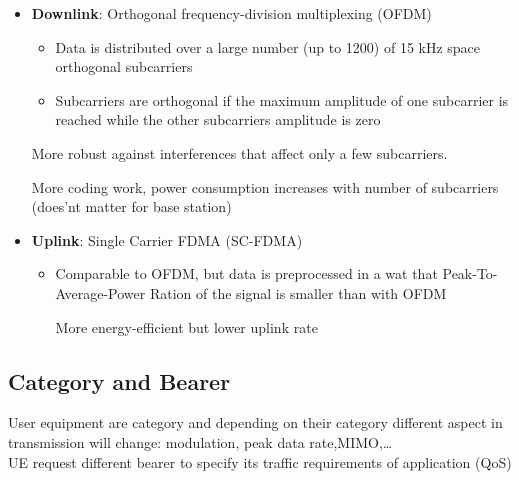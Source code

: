 \begin{itemize}
    \item \textbf{Downlink}: Orthogonal frequency-division multiplexing
        (OFDM)
        \begin{itemize}
            \item Data is distributed over a large number (up to 1200) of 15 kHz
                space orthogonal subcarriers

            \item Subcarriers are orthogonal if the maximum amplitude of one subcarrier
        is reached while the other subcarriers amplitude is zero	
        \end{itemize}
        \begin{description}
                \proitem{} More robust against interferences that affect only a 
                few subcarriers.

            \consitem{} More coding work, power consumption increases
                with number of subcarriers (does'nt matter for base station)

        \end{description}

    \item \textbf{Uplink}:  Single Carrier FDMA (SC-FDMA)
        \begin{itemize}
            \item Comparable to OFDM, but data is preprocessed in a wat that 
                Peak-To-Average-Power Ration of the signal is smaller than with 
                OFDM

                \proitem{} More energy-efficient
                \consitem{} but lower uplink rate
        \end{itemize}
\end{itemize}

\subsection{Category and Bearer}
User equipment are category and depending on their category 
different aspect in transmission will change: modulation, peak data rate,MIMO,\ldots\\
UE request different bearer to specify its traffic requirements of application (QoS)


